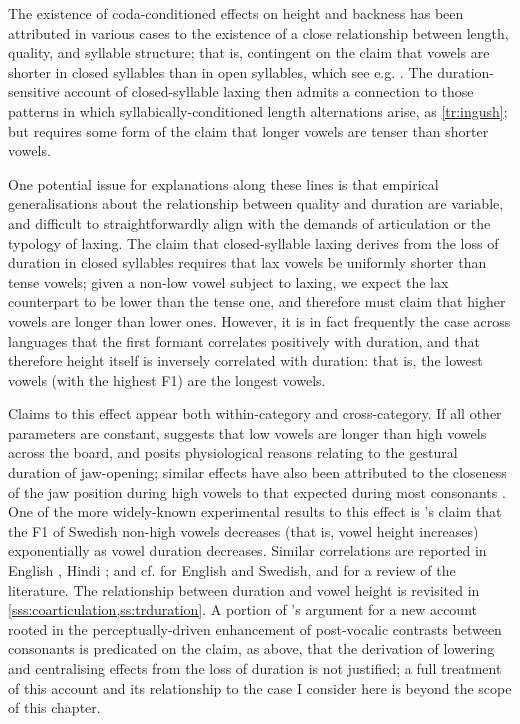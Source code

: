 The existence of coda-conditioned effects on height and backness has been attributed in various cases \citep{Fery2003,Botma2012} to the existence of a close relationship between length, quality, and syllable structure; that is, contingent on the claim that vowels are shorter in closed syllables than in open syllables, which see e.g. \citet{Maddieson1985}. The duration-sensitive account of closed-syllable laxing then admits a connection to those patterns in which syllabically-conditioned length alternations arise, as \cref{tr:ingush}; but requires some form of the claim that longer vowels are tenser than shorter vowels.

One potential issue for explanations along these lines is that empirical generalisations about the relationship between quality and duration are variable, and difficult to straightforwardly align with the demands of articulation or the typology of laxing. The claim that closed-syllable laxing derives from the loss of duration in closed syllables requires that lax vowels be uniformly shorter than tense vowels; given a non-low vowel subject to laxing, we expect the lax counterpart to be lower than the tense one, and therefore must claim that higher vowels are longer than lower ones. However, it is in fact frequently the case across languages that the first formant correlates positively with duration, and that therefore height itself is inversely correlated with duration: that is, the lowest vowels (with the highest F1) are the longest vowels.

Claims to this effect appear both within-category and cross-category. If all other parameters are constant, \citet{Lehiste1970} suggests that low vowels are longer than high vowels across the board, and posits physiological reasons relating to the gestural duration of jaw-opening; similar effects have also been attributed to the closeness of the jaw position during high vowels to that expected during most consonants \citep{Maddieson1997,Gussenhoven2007}. One of the more widely-known experimental results to this effect is \cite{Lindblom1963}'s claim that the F1 of Swedish non-high vowels decreases (that is, vowel height increases) exponentially as vowel duration decreases. Similar correlations are reported in English \citep{Peterson1960,Westbury1980}, Hindi \citep{Ohala1992}; and cf. \citet{Toivonen2015} for English and Swedish, and for a review of the literature. The relationship between duration and vowel height is revisited in \cref{sss:coarticulation,ss:trduration}. A portion of \citet{Storme2017ms,Storme2017,Storme2017PhD}'s argument for a new account rooted in the perceptually-driven enhancement of post-vocalic contrasts between consonants is predicated on the claim, as above, that the derivation of lowering and centralising effects from the loss of duration is not justified; a full treatment of this account and its relationship to the case I consider here is beyond the scope of this chapter.

